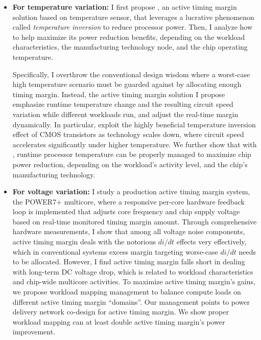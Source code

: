 \begin{itemize}

\item \textbf{For temperature variation:} I first propose \tistates, an active timing margin solution based on temperature sensor, that leverages a lucrative phenomenon called \textit{temperature inversion} to reduce processor power. Then, I analyze how to help \tistates maximize its power reduction benefits, depending on the workload characteristics, the manufacturing technology node, and the chip operating temperature.

Specifically, I overthrow the conventional design wisdom where a worst-case high temperature scenario must be guarded against by allocating enough timing margin. Instead, the \tistates active timing margin solution I propose emphasize runtime temperature change and the resulting circuit speed variation while different workloads run, and adjust the real-time margin dynamically. In particular, \tistates exploit the highly beneficial temperature inversion effect of CMOS transistors as technology scales down, where circuit speed accelerates significantly under higher temperature. We further show that with \tistates, runtime processor temperature can be properly managed to maximize chip power reduction, depending on the workload's activity level, and the chip's manufacturing technology.


\item \textbf{For voltage variation:}  I study a production active timing margin system, the POWER7+ multicore, where a responsive per-core hardware feedback loop is implemented that adjusts core frequency and chip supply voltage based on real-time monitored timing margin amount. Through comprehensive hardware measurements, I show that among all voltage noise components, active timing margin deals with the notorious $di/dt$ effects very effectively, which in conventional systems excess margin targeting worse-case $di/dt$ needs to be allocated. However, I find active timing margin falls short in dealing with long-term DC voltage drop, which is related to workload characteristics and chip-wide multicore activities. To maximize active timing margin's gains, we propose workload mapping management to balance compute loads on different active timing margin ``domains''. Our management points to power delivery network co-design for active timing margin. We show proper workload mapping can at least double active timing margin's power improvement.


\end{itemize}
